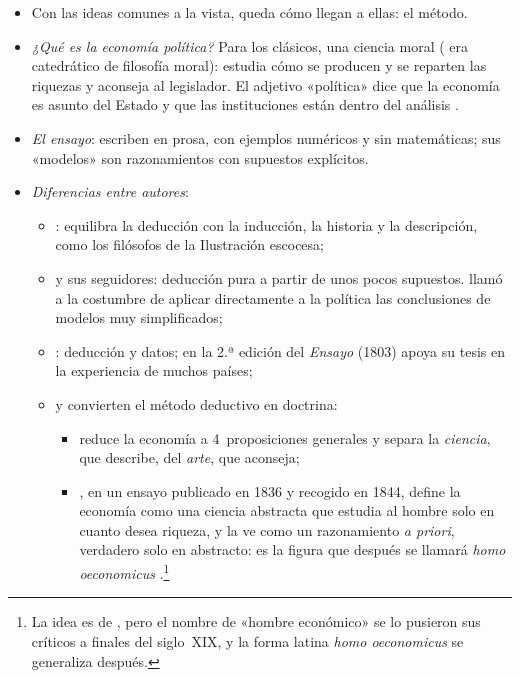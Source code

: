 \documentclass[11pt]{article}
\begin{document}
\begin{itemize}
\item Con las ideas comunes a la vista, queda cómo llegan a ellas: el método.
\item \emph{¿Qué es la economía política?} Para los clásicos, una ciencia moral ( era catedrático de filosofía moral): estudia cómo se producen y se reparten las riquezas y aconseja al legislador. El adjetivo «política» dice que la economía es asunto del Estado y que las instituciones están dentro del análisis .
\item \emph{El ensayo}: escriben en prosa, con ejemplos numéricos y sin matemáticas; sus «modelos» son razonamientos con supuestos explícitos.
\item \emph{Diferencias entre autores}:
  \begin{itemize}
  \item {}: equilibra la deducción con la inducción, la historia y la descripción, como los filósofos de la Ilustración escocesa\nocite{HET2026Scottish};
  \item {} y sus seguidores: deducción pura a partir de unos pocos supuestos.  llamó  a la costumbre de aplicar directamente a la política las conclusiones de modelos muy simplificados\nocite{Schumpeter1954History};
  \item {}: deducción y datos; en la 2.ª edición del \emph{Ensayo} (1803) apoya su tesis en la experiencia de muchos países;
  \item {} y  convierten el método deductivo en doctrina:
    \begin{itemize}
    \item \textcite{Senior1836Outline} reduce la economía a 4~proposiciones generales y separa la \emph{ciencia}, que describe, del \emph{arte}, que aconseja;
    \item {}, en un ensayo publicado en 1836 y recogido en 1844, define la economía como una ciencia abstracta que estudia al hombre solo en cuanto desea riqueza, y la ve como un razonamiento \emph{a priori}, verdadero solo en abstracto\nocite{Mill1836Definition}: es la figura que después se llamará \emph{homo oeconomicus} .\footnote{La idea es de , pero el nombre de «hombre económico» se lo pusieron sus críticos a finales del siglo~XIX, y la forma latina \emph{homo oeconomicus} se generaliza después\nocite{Persky1995Ethology}.}
    \end{itemize}

\end{itemize}
\end{itemize}
\end{document}
